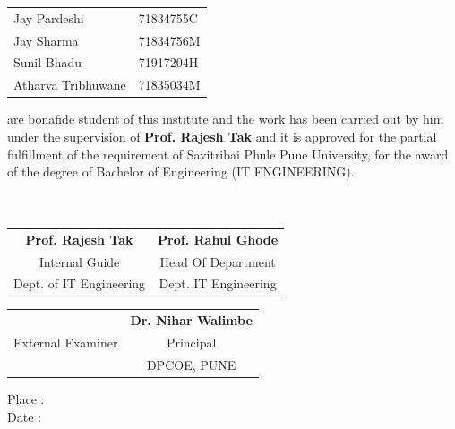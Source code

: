 \documentclass[oneside,a4paper,12pt]{report}
\begin{document}
\begin{center}
\begin{tabular}{l l}
Jay Pardeshi & 71834755C\\
Jay Sharma & 71834756M\\
Sunil Bhadu & 71917204H\\
Atharva Tribhuwane & 71835034M\\
\end{tabular}
\end{center}

\vspace*{0.5\baselineskip}

are bonafide student of this institute and the work has been carried out by him under the supervision of \textbf{Prof. Rajesh Tak} and it is approved for the partial fulfillment of the requirement of Savitribai Phule Pune University, for the award of the degree of Bachelor of Engineering (IT ENGINEERING). \\\\\\


\bgroup
\def\arraystretch{0.5}
\begin{tabular}{c c }
\textbf{Prof. Rajesh Tak} &  \hspace{55 mm} \textbf{Prof. Rahul Ghode} \\								
Internal Guide   &  \hspace{55 mm}Head Of Department \\
Dept. of IT Engineering &	\hspace{55 mm}Dept. IT Engineering
\end{tabular}

\vspace*{4\baselineskip}
\bgroup
\def\arraystretch{0.5}
\begin{tabular}{c c }
 &  \hspace{60 mm} \textbf{Dr. Nihar Walimbe} \\								
 \hspace{5 mm}External Examiner  &  \hspace{60 mm}Principal \\
  &	\hspace{60 mm}DPCOE, PUNE\\
\end{tabular}
\vspace*{0.5\baselineskip}

Place : \\
Date  : 


\thispagestyle{plain}
\setcounter{page}{0}
\frontmatter
{}
\rfoot{\thepage}
\end{document}
